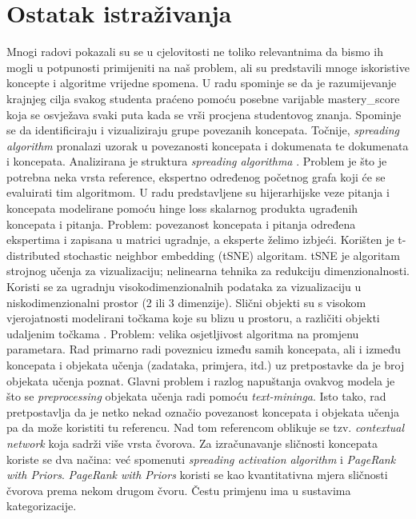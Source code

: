 \section{Ostatak istraživanja}
Mnogi radovi pokazali su se u cjelovitosti ne toliko relevantnima da bismo ih mogli u potpunosti primijeniti na naš problem, ali su predstavili mnoge iskoristive koncepte i algoritme vrijedne spomena.\newline
\newline
U radu \citep{its} spominje se da je razumijevanje krajnjeg cilja svakog studenta praćeno pomoću posebne varijable mastery\_score koja se osvježava svaki puta kada se vrši procjena studentovog znanja. \newline
Spominje se da identificiraju i vizualiziraju grupe povezanih koncepata. Točnije, \textit{spreading algorithm} pronalazi uzorak u povezanosti koncepata i dokumenata te dokumenata i koncepata. Analizirana je struktura \textit{spreading algorithma} \citep{spreading}.\newline
Problem je što je potrebna neka vrsta reference, ekspertno određenog početnog grafa koji će se evaluirati tim algoritmom.\newline
\newline
U radu \citep{dhkt} predstavljene su hijerarhijske veze pitanja i koncepata modelirane pomoću hinge loss skalarnog produkta ugrađenih koncepata i pitanja. Problem: povezanost koncepata i pitanja određena ekspertima i zapisana u matrici ugradnje, a eksperte želimo izbjeći. Korišten je t-distributed stochastic neighbor embedding (tSNE) algoritam.
tSNE je algoritam strojnog učenja za vizualizaciju; nelinearna tehnika za redukciju dimenzionalnosti. Koristi se za ugradnju visokodimenzionalnih podataka za vizualizaciju u niskodimenzionalni prostor (2 ili 3 dimenzije). Slični objekti su s visokom vjerojatnosti modelirani točkama koje su blizu u prostoru, a različiti objekti udaljenim točkama \citep{tdsne}.
Problem: velika osjetljivost algoritma na promjenu parametara.\newline
\newline
Rad \citep{conc_rel} primarno radi poveznicu između samih koncepata, ali i između koncepata i objekata učenja (zadataka, primjera, itd.) uz pretpostavke da je broj objekata učenja poznat. Glavni problem i razlog napuštanja ovakvog modela je što se \textit{preprocessing} objekata učenja radi pomoću \textit{text-mininga}. Isto tako, rad pretpostavlja da je netko nekad označio povezanost koncepata i objekata učenja pa da može koristiti tu referencu. Nad tom referencom oblikuje se tzv. \textit{contextual network} koja sadrži više vrsta čvorova. Za izračunavanje sličnosti koncepata koriste se dva načina: već spomenuti \textit{spreading activation algorithm} i \textit{PageRank with Priors}.\textit{ PageRank with Priors} koristi se kao kvantitativna mjera sličnosti čvorova prema nekom drugom čvoru. Čestu primjenu ima u sustavima kategorizacije.
